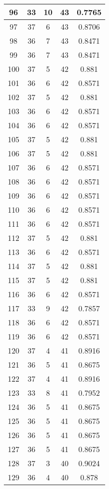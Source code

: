 \documentclass[letterpaper, 12pt]{article}
\begin{document}
\begin{longtable}{|c|c|c|c|c|}
\hline
96 & 33 & 10 & 43 & 0.7765 \\
\hline
97 & 37 & 6 & 43 & 0.8706 \\
\hline
98 & 36 & 7 & 43 & 0.8471 \\
\hline
99 & 36 & 7 & 43 & 0.8471 \\
\hline
100 & 37 & 5 & 42 & 0.881 \\
\hline
101 & 36 & 6 & 42 & 0.8571 \\
\hline
102 & 37 & 5 & 42 & 0.881 \\
\hline
103 & 36 & 6 & 42 & 0.8571 \\
\hline
104 & 36 & 6 & 42 & 0.8571 \\
\hline
105 & 37 & 5 & 42 & 0.881 \\
\hline
106 & 37 & 5 & 42 & 0.881 \\
\hline
107 & 36 & 6 & 42 & 0.8571 \\
\hline
108 & 36 & 6 & 42 & 0.8571 \\
\hline
109 & 36 & 6 & 42 & 0.8571 \\
\hline
110 & 36 & 6 & 42 & 0.8571 \\
\hline
111 & 36 & 6 & 42 & 0.8571 \\
\hline
112 & 37 & 5 & 42 & 0.881 \\
\hline
113 & 36 & 6 & 42 & 0.8571 \\
\hline
114 & 37 & 5 & 42 & 0.881 \\
\hline
115 & 37 & 5 & 42 & 0.881 \\
\hline
116 & 36 & 6 & 42 & 0.8571 \\
\hline
117 & 33 & 9 & 42 & 0.7857 \\
\hline
118 & 36 & 6 & 42 & 0.8571 \\
\hline
119 & 36 & 6 & 42 & 0.8571 \\
\hline
120 & 37 & 4 & 41 & 0.8916 \\
\hline
121 & 36 & 5 & 41 & 0.8675 \\
\hline
122 & 37 & 4 & 41 & 0.8916 \\
\hline
123 & 33 & 8 & 41 & 0.7952 \\
\hline
124 & 36 & 5 & 41 & 0.8675 \\
\hline
125 & 36 & 5 & 41 & 0.8675 \\
\hline
126 & 36 & 5 & 41 & 0.8675 \\
\hline
127 & 36 & 5 & 41 & 0.8675 \\
\hline
128 & 37 & 3 & 40 & 0.9024 \\
\hline
129 & 36 & 4 & 40 & 0.878 \\

\end{longtable}
\end{document}
